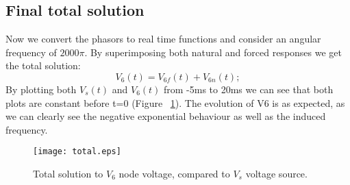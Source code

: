 \subsection{Final total solution}
Now we convert the phasors to real time functions and consider an angular frequency of $2000\pi$. By superimposing both natural and forced responses we get the total solution:
\begin{equation}
V_{6}(t)=V_{6f}(t)+V_{6n}(t);
\end{equation}
By plotting both $V_s(t)$ and $V_6(t)$ from -5ms to 20ms we can see that both plots are constant before t=0 (Figure ~\ref{fig:tt}). The evolution of V6 is as expected, as we can clearly see the negative exponential behaviour as well as the induced frequency.
\begin{figure}[h] \centering
\texttt{[image: total.eps]}
\caption{Total solution to $V_{6}$ node voltage, compared to $V_{s}$ voltage source.}
\label{fig:tt}
\end{figure}
